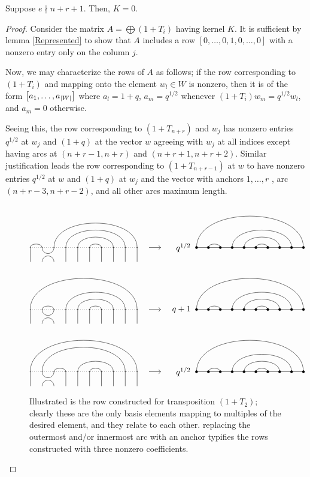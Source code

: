 \documentclass{amsart}
\begin{document}
\begin{lemma}\label{Trivial}
  Suppose $e \nmid n + r + 1$.
  Then, $K = 0$.
\end{lemma}
\begin{proof}
  Consider the matrix $A = \bigoplus (1 + T_i)$ having kernel $K$.
  It is sufficient by lemma \ref{Represented} to show that $A$ includes a row $[0,\dots,0,1,0,\dots,0]$ with a nonzero entry only on the column $j$.

  Now, we may characterize the rows of $A$ as follows;
  if the row corresponding to $(1 + T_i)$ and mapping onto the element $w_l \in W$ is nonzero, then it is of the form $\left[ a_1,\dots,a_{\left| W \right|} \right]$ where $a_l = 1 + q$, $a_m = q^{1/2}$ whenever $(1 + T_i)w_m = q^{1/2}w_l$, and $a_m = 0$ otherwise.
  
  Seeing this, the row corresponding to $(1 + T_{n + r})$ and $w_j$ has nonzero entries $q^{1/2}$ at $w_j$ and $(1 + q)$ at the vector $w$ agreeing with $w_j$ at all indices except having arcs at $(n+r-1,n+r)$ and $(n+r+1,n+r+2)$.
  Similar justification leads the row corresponding to $(1 + T_{n+r-1})$ at $w$ to have nonzero entries $q^{1/2}$ at $w$ and $(1 + q)$ at $w_j$ and the vector with anchors $1,\dots,r$ , arc $(n+r-3,n+r-2)$, and all other arcs maximum length.
  
  \begin{figure}
   \[
     \Action{10}{1/2,3/10,4/9,5/8,6/7}{2}{1/10,2/3,4/9,5/8,6/7}{q^{1/2}}
   \]
   \[
     \Action{10}{1/10,2/3,4/9,5/8,6/7}{2}{1/10,2/3,4/9,5/8,6/7}{q+1}
   \]
   \[
     \Action{10}{1/10,2/9,3/4,5/8,6/7}{2}{1/10,2/3,4/9,5/8,6/7}{q^{1/2}}
   \]
   \caption{Illustrated is the row constructed for transposition $(1 + T_2)$; clearly these are the only basis elements mapping to multiples of the desired element, and they relate to each other.
     replacing the outermost and/or innermost arc with an anchor typifies the rows constructed with three nonzero coefficients.}
 \label{Submatrix}
 \end{figure}
 

\end{proof}
\end{document}
